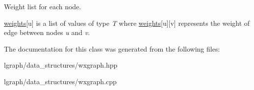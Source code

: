 Weight list for each node. 

\hyperlink{classlgraph_1_1wxgraph_a6f8c983edc82913c2d78b7bc871defe8}{weights}\mbox{[}u\mbox{]} is a list of values of type {\itshape T} where \hyperlink{classlgraph_1_1wxgraph_a6f8c983edc82913c2d78b7bc871defe8}{weights}\mbox{[}u\mbox{]}\mbox{[}v\mbox{]} represents the weight of edge between nodes {\itshape u} and {\itshape v}. 

The documentation for this class was generated from the following files\-:\begin{DoxyCompactItemize}
\item 
lgraph/data\-\_\-structures/wxgraph.\-hpp\item 
lgraph/data\-\_\-structures/wxgraph.\-cpp\end{DoxyCompactItemize}

